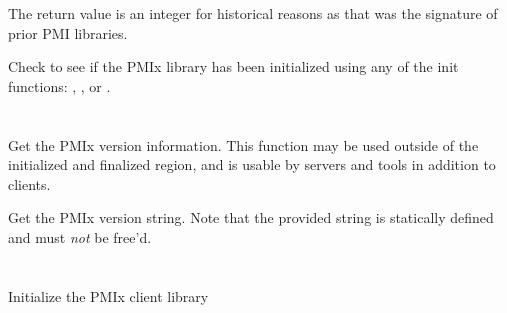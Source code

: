 \rationalestart
The return value is an integer for historical reasons as that was the signature of prior PMI libraries.
\rationaleend

\descr

Check to see if the \ac{PMIx} library has been initialized using any of the init functions:
, , or .


\section{}

\summary

Get the \ac{PMIx} version information. This function may be used outside of the initialized and finalized region, and is usable by servers and tools in addition to clients.

\format


\descr

Get the \ac{PMIx} version string.
Note that the provided string is statically defined and must \textit{not} be free'd.


\section{}

\summary

Initialize the \ac{PMIx} client library

\format


\begin{arglist}
\end{arglist}


